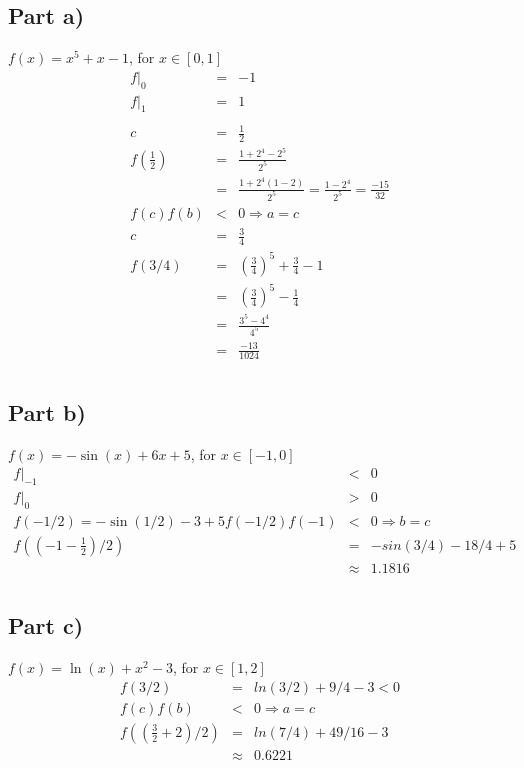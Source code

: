 \documentclass[12pt]{article}
\begin{document}
\subsection*{Part a)}
\(f(x) = x^{5} + x - 1\), for \( x \in [0, 1]\)\\

\begin{eqnarray*}
f|_{0} & = & -1\\
f|_{1} & = & 1\\
\\
c & = & \frac{1}{2}\\
f(\frac{1}{2}) & = & \frac{1 + 2^{4} - 2^{5}}{2^{5}}\\
& = & \frac{1 + 2^{4}(1 - 2)}{2^{5}} = \frac{1 - 2^{4}}{2^5} = \frac{-15}{32}\\
f(c)f(b) & < & 0
\Rightarrow a = c\\
c & = &\frac{3}{4}\\
f(3/4) & = & (\frac{3}{4})^{5} + \frac{3}{4} - 1\\
& = & (\frac{3}{4})^{5} - \frac{1}{4}\\
& = & \frac{3^{5} - 4^{4}}{4^{5}}\\
& = & \frac{-13}{1024}\\
\end{eqnarray*}

\subsection*{Part b)}
\(f(x) = -\sin(x) + 6x + 5\), for \(x \in [-1, 0]\)\\
\begin{eqnarray*}
f|_{-1} & < & 0\\
f|_{0} & > & 0\\
f(-1/2) = -\sin(1/2) - 3 + 5
f(-1/2)f(-1) & < & 0 \Rightarrow b = c\\
f((-1 - \frac{1}{2})/2) & = & -sin(3/4) - 18/4 + 5\\
& \approx & 1.1816\\
\end{eqnarray*}

\subsection*{Part c)}
\(f(x) = \ln(x) + x^{2} - 3\), for \(x \in [1,2]\)\\
\begin{eqnarray*}
f(3/2) & = & ln(3/2) + 9/4 - 3 < 0\\
f(c)f(b) & < & 0 \Rightarrow a = c\\
f((\frac{3}{2} + 2)/2) & = & ln(7/4) + 49/16 - 3\\
& \approx & 0.6221\\
\end{eqnarray*}
\end{document}
